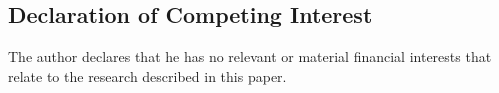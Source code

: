 \documentclass{wptemp}
\makeatletter
\let\estinput= define a new input command so that we can still flatten the document
\newcommand{\estwide}[3]{
		\vspace{.75ex}{
			\begin{tabular*}
			{\textwidth}{@{\hskip\tabcolsep\extracolsep\fill}l*{#2}{#3}}
			\toprule
			\estinput{#1}
			\bottomrule
			\addlinespace[.75ex]
			\end{tabular*}
			}
		}
\makeatother
\begin{document}
\begin{appendices}

\section{Declaration of Competing Interest}
The author declares that he has no relevant or material financial interests that relate to the research described in this paper.




\end{appendices}
\end{document}
